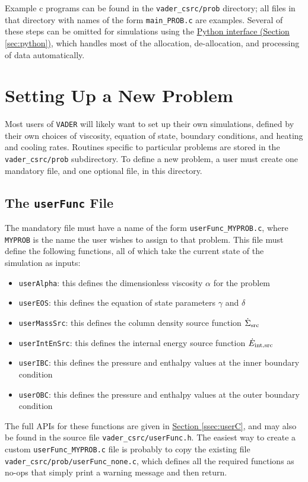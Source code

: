 \documentclass[12pt]{article}
\begin{document}
Example c programs can be found in the \verb=vader_csrc/prob= directory; all files in that directory with names of the form \verb=main_PROB.c= are examples. Several of these steps can be omitted for simulations using the \hyperref[sec:python]{Python interface (Section \ref{sec:python})}, which handles most of the allocation, de-allocation, and processing of data automatically.


\section{Setting Up a New Problem}

Most users of \texttt{VADER} will likely want to set up their own simulations, defined by their own choices of viscosity, equation of state, boundary conditions, and heating and cooling rates. Routines specific to particular problems are stored in the \verb=vader_csrc/prob= subdirectory. To define a new problem, a user must create one mandatory file, and one optional file, in this directory.

\subsection{The \texttt{userFunc} File}
\label{ssec:userFunc}

The mandatory file must have a name of the form \verb=userFunc_MYPROB.c=, where \verb=MYPROB= is the name the user wishes to assign to that problem. This file must define the following functions, all of which take the current state of the simulation as inputs:
\begin{itemize}
\item \texttt{userAlpha}: this defines the dimensionless viscosity $\alpha$ for the problem
\item \texttt{userEOS}: this defines the equation of state parameters $\gamma$ and $\delta$
\item \texttt{userMassSrc}: this defines the column density source function $\dot{\Sigma}_{\rm src}$
\item \texttt{userIntEnSrc}: this defines the internal energy source function $\dot{E}_{\rm int,src}$
\item \texttt{userIBC}: this defines the pressure and enthalpy values at the inner boundary condition
\item \texttt{userOBC}: this defines the pressure and enthalpy values at the outer boundary condition
\end{itemize}
The full APIs for these functions are given in \hyperref[ssec:userC]{Section \ref{ssec:userC}}, and may also be found in the source file \verb=vader_csrc/userFunc.h=. The easiest way to create a custom \verb=userFunc_MYPROB.c= file is probably to copy the existing file \verb=vader_csrc/prob/userFunc_none.c=, which defines all the required functions as no-ops that simply print a warning message and then return.
\end{document}
